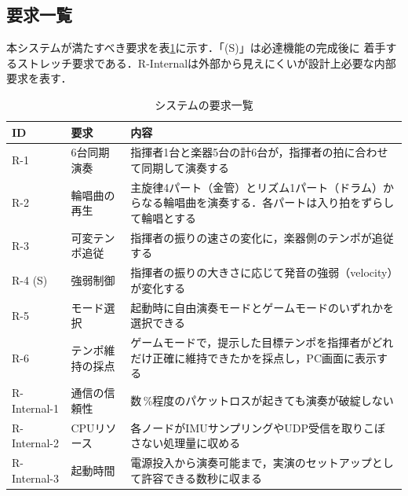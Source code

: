 \documentclass[lualatex,book,paper=a4paper,jafontsize=11.5pt,jafontscale=1.05]{jlreq}
\begin{document}
\subsection{要求一覧}
本システムが満たすべき要求を表\ref{tab:requirements}に示す．「(S)」は必達機能の完成後に
着手するストレッチ要求である．R-Internalは外部から見えにくいが設計上必要な内部要求を表す．
\begin{table}[H]\centering
  \caption{システムの要求一覧}\label{tab:requirements}
  \small
  \begin{tabularx}{\linewidth}{>{\raggedright\arraybackslash}p{2.5cm} >{\raggedright\arraybackslash}p{2.7cm} X}
    \toprule
    ID & 要求 & 内容 \\
    \midrule
    R-1 & 6台同期演奏 & 指揮者1台と楽器5台の計6台が，指揮者の拍に合わせて同期して演奏する \\
    R-2 & 輪唱曲の再生 & 主旋律4パート（金管）とリズム1パート（ドラム）からなる輪唱曲を演奏する．各パートは入り拍をずらして輪唱とする \\
    R-3 & 可変テンポ追従 & 指揮者の振りの速さの変化に，楽器側のテンポが追従する \\
    R-4 (S) & 強弱制御 & 指揮者の振りの大きさに応じて発音の強弱（velocity）が変化する \\
    R-5 & モード選択 & 起動時に自由演奏モードとゲームモードのいずれかを選択できる \\
    R-6 & テンポ維持の採点 & ゲームモードで，提示した目標テンポを指揮者がどれだけ正確に維持できたかを採点し，PC画面に表示する \\
    R-Internal-1 & 通信の信頼性 & 数\,\%程度のパケットロスが起きても演奏が破綻しない \\
    R-Internal-2 & CPUリソース & 各ノードがIMUサンプリングやUDP受信を取りこぼさない処理量に収める \\
    R-Internal-3 & 起動時間 & 電源投入から演奏可能まで，実演のセットアップとして許容できる数秒に収まる \\
    \bottomrule
  \end{tabularx}
\end{table}
\end{document}
